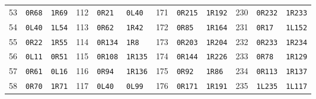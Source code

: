\begin{longtable}{rllrllrllrll}
53 & \texttt{0R68} & \texttt{1R69} & 112 & \texttt{0R21} & \texttt{0L40} & 171 & \texttt{0R215} & \texttt{1R192} & 230 & \texttt{0R232} & \texttt{1R233}\\
54 & \texttt{0L40} & \texttt{1L54} & 113 & \texttt{0R62} & \texttt{1R42} & 172 & \texttt{0R85} & \texttt{1R164} & 231 & \texttt{0R17} & \texttt{1L152}\\
55 & \texttt{0R22} & \texttt{1R55} & 114 & \texttt{0R134} & \texttt{1R8} & 173 & \texttt{0R203} & \texttt{1R204} & 232 & \texttt{0R233} & \texttt{1R234}\\
56 & \texttt{0L11} & \texttt{0R51} & 115 & \texttt{0R108} & \texttt{1R135} & 174 & \texttt{0R144} & \texttt{1R226} & 233 & \texttt{0R78} & \texttt{1R129}\\
57 & \texttt{0R61} & \texttt{0L16} & 116 & \texttt{0R94} & \texttt{1R136} & 175 & \texttt{0R92} & \texttt{1R86} & 234 & \texttt{0R113} & \texttt{1R137}\\
58 & \texttt{0R70} & \texttt{1R71} & 117 & \texttt{0L40} & \texttt{0L99} & 176 & \texttt{0R171} & \texttt{1R191} & 235 & \texttt{1L235} & \texttt{1L117}\\
\end{longtable}
\endgroup
